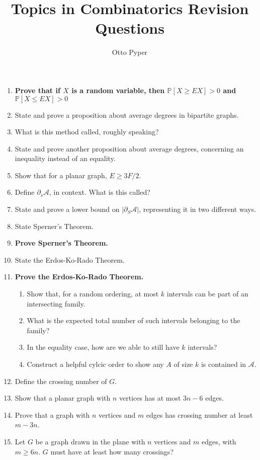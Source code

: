 \documentclass{article}
\title{Topics in Combinatorics Revision Questions}
\author{Otto Pyper}
\date{}
\newcommand{\mc}[1]{\mathcal{#1}}
\renewcommand{\P}{\mathbb{P}}
\begin{document}
    
\maketitle

\begin{enumerate}
    \item \textbf{Prove that if $X$ is a random variable, then $\P[X\ge EX] > 0$ and $\P[X\le EX] > 0$}
    \item State and prove a proposition about average degrees in bipartite graphs.
    \item What is this method called, roughly speaking?
    \item State and prove another proposition about average degrees, concerning an inequality instead of an equality.
    \item Show that for a planar graph, $E\ge 3F/2$.
    \item Define $\partial_s\mc{A}$, in context. What is this called?
    \item State and prove a lower bound on $|\partial_S\mc{A}|$, representing it in two different ways.
    \item State Sperner's Theorem.
    \item \textbf{Prove Sperner's Theorem.}
    \item State the Erdos-Ko-Rado Theorem.
    \item \textbf{Prove the Erdos-Ko-Rado Theorem.}
    \begin{enumerate}
        \item Show that, for a random ordering, at most $k$ intervals can be part of an intersecting family.
        \item What is the expected total number of such intervals belonging to the family?
        \item In the equality case, how are we able to still have $k$ intervals?
        \item Construct a helpful cylcic order to show any $A$ of size $k$ is contained in $\mc{A}$.
    \end{enumerate}
    \item Define the crossing number of $G$.
    \item Show that a planar graph with $n$ vertices has at most $3n-6$ edges.
    \item Prove that a graph with $n$ vertices and $m$ edges has crossing number at least $m - 3n$.
    \item Let $G$ be a graph drawn in the plane with $n$ vertices and $m$ edges, with $m\ge 6n$. $G$ must have at least how many crossings?

\end{enumerate}
\end{document}
